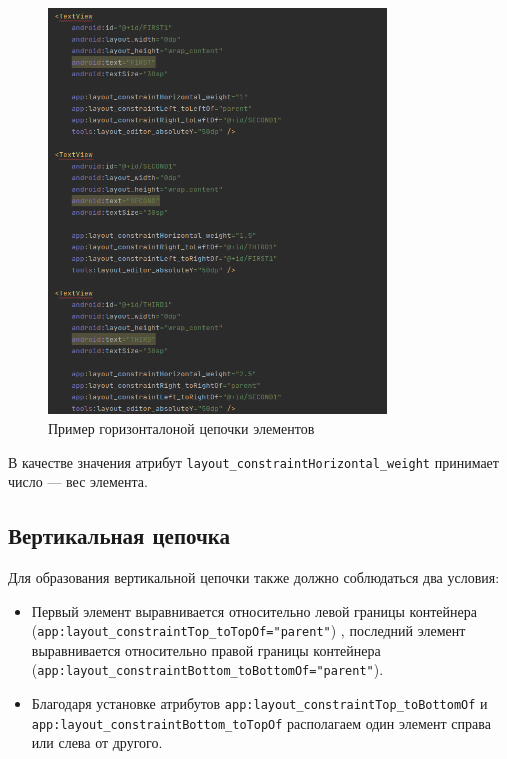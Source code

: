 \begin{figure}[h!tp]
	\centering
	\includegraphics[width=0.8\textwidth]{Screenshot from 2023-03-12 16-10-36.png}
	\caption{Пример горизонталоной цепочки элементов}
	\label{fig:xml:chain:horizontal:weight}
\end{figure}

В качестве значения атрибут \texttt{layout\_constraintHorizontal\_weight}
принимает число --- вес элемента.

\subsection{Вертикальная цепочка}
Для образования вертикальной цепочки также должно соблюдаться два
условия:
\begin{itemize}
	\item Первый элемент выравнивается относительно левой границы
		контейнера (\texttt{app:layout\_constraintTop\_toTopOf="parent"})
		, последний
		элемент выравнивается относительно правой границы контейнера
		(\texttt{app:layout\_constraintBottom\_toBottomOf="parent"}).
	\item Благодаря установке атрибутов
		\texttt{app:layout\_constraintTop\_toBottomOf} и
		\texttt{app:layout\_constraintBottom\_toTopOf}
		располагаем один элемент справа или слева от другого.
\end{itemize}


